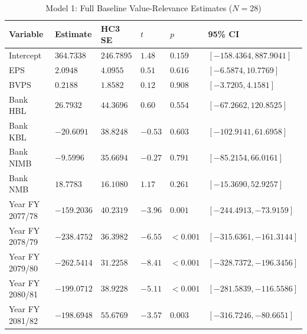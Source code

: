 \begin{table}[!htbp]
\centering
\small
\setlength{\tabcolsep}{4pt}
\caption{Model 1: Full Baseline Value-Relevance Estimates ($N = 28$)}
\label{tab:app_m1full}
\begin{tabular}{>{\raggedright\arraybackslash}p{}>{\raggedright\arraybackslash}p{}>{\raggedright\arraybackslash}p{}>{\raggedright\arraybackslash}p{}>{\raggedright\arraybackslash}p{}>{\raggedright\arraybackslash}p{}}
\toprule
\textbf{Variable} & \textbf{Estimate} & \textbf{HC3 SE} & \textbf{$t$} & \textbf{$p$} & \textbf{95\% CI} \\
\midrule
Intercept & $364.7338$ & $246.7895$ & $1.48$ & $0.159$ & $[-158.4364, 887.9041]$ \\
\addlinespace
EPS & $2.0948$ & $4.0955$ & $0.51$ & $0.616$ & $[-6.5874, 10.7769]$ \\
\addlinespace
BVPS & $0.2188$ & $1.8582$ & $0.12$ & $0.908$ & $[-3.7205, 4.1581]$ \\
\addlinespace
Bank HBL & $26.7932$ & $44.3696$ & $0.60$ & $0.554$ & $[-67.2662, 120.8525]$ \\
\addlinespace
Bank KBL & $-20.6091$ & $38.8248$ & $-0.53$ & $0.603$ & $[-102.9141, 61.6958]$ \\
\addlinespace
Bank NIMB & $-9.5996$ & $35.6694$ & $-0.27$ & $0.791$ & $[-85.2154, 66.0161]$ \\
\addlinespace
Bank NMB & $18.7783$ & $16.1080$ & $1.17$ & $0.261$ & $[-15.3690, 52.9257]$ \\
\addlinespace
Year FY 2077/78 & $-159.2036$ & $40.2319$ & $-3.96$ & $0.001$ & $[-244.4913, -73.9159]$ \\
\addlinespace
Year FY 2078/79 & $-238.4752$ & $36.3982$ & $-6.55$ & $<0.001$ & $[-315.6361, -161.3144]$ \\
\addlinespace
Year FY 2079/80 & $-262.5414$ & $31.2258$ & $-8.41$ & $<0.001$ & $[-328.7372, -196.3456]$ \\
\addlinespace
Year FY 2080/81 & $-199.0712$ & $38.9228$ & $-5.11$ & $<0.001$ & $[-281.5839, -116.5586]$ \\
\addlinespace
Year FY 2081/82 & $-198.6948$ & $55.6769$ & $-3.57$ & $0.003$ & $[-316.7246, -80.6651]$ \\
\bottomrule
\end{tabular}


\end{table}
